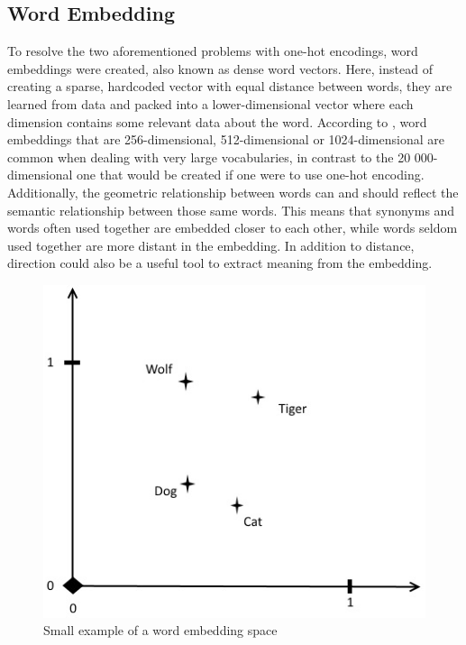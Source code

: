 \documentclass[nofilelist]{cslthse-msc}
\begin{document}
\subsection{Word Embedding}
To resolve the two aforementioned problems with one-hot encodings, word embeddings were created, also known as dense word vectors. \citep{neuralnetworkmethods} 
Here, instead of creating a sparse, hardcoded vector with equal distance between words, they are learned from data and packed into a lower-dimensional vector where each dimension contains some relevant data about the word. According to \citet{franoischollet2017learning}, word embeddings that are 256-dimensional, 512-dimensional or 1024-dimensional are common when dealing with very large vocabularies, in contrast to the 20 000-dimensional one that would be created if one were to use one-hot encoding. Additionally, the geometric relationship between words can and should reflect the semantic relationship between those same words. This means that synonyms and words often used together are embedded closer to each other, while words seldom used together are more distant in the embedding. In addition to distance, direction could also be a useful tool to extract meaning from the embedding.\newpage %

\begin{figure}
\includegraphics[width=0.9\linewidth]{msccls/explanatory_images/embedding_direction.png} 
\caption{Small example of a word embedding space}
\label{fig:direction}
\end{figure}
\end{document}
